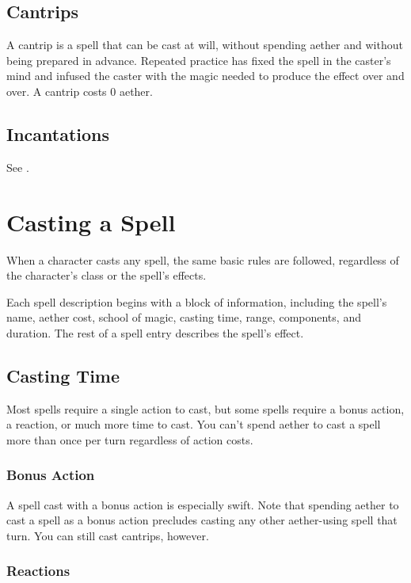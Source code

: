 \subsection{Cantrips}

A cantrip is a spell that can be cast at will, without spending aether and without being prepared in advance. Repeated practice has fixed the spell in the caster's mind and infused the caster with the magic needed to produce the effect over and over. A cantrip costs 0 aether.

\subsection{Incantations}
See .

\section{Casting a Spell}

When a character casts any spell, the same basic rules are followed, regardless of the character's class or the spell's effects.

Each spell description begins with a block of information, including the spell's name, aether cost, school of magic, casting time, range, components, and duration. The rest of a spell entry describes the spell's effect.

\subsection{Casting Time}

Most spells require a single action to cast, but some spells require a bonus action, a reaction, or much more time to cast. You can't spend aether to cast a spell more than once per turn regardless of action costs.

\subsubsection{Bonus Action}

A spell cast with a bonus action is especially swift. Note that spending aether to cast a spell as a bonus action precludes casting any other aether-using spell that turn. You can still cast cantrips, however.

\subsubsection{Reactions}

